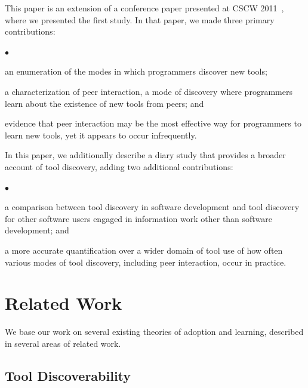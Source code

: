 \documentclass[smallextended]{svjour3}
\newcommand{\squishlist}{
	\vspace{0mm}
   \begin{list}{$\bullet$}
    { \setlength{\itemsep}{0pt}      \setlength{\parsep}{3pt}
      \setlength{\topsep}{3pt}       \setlength{\partopsep}{0pt}
      \setlength{\leftmargin}{1.5em} \setlength{\labelwidth}{1em}
      \setlength{\labelsep}{0.5em} } }
\newcommand{\squishend}{
    \end{list}  }
\newcommand\discovery{peer interaction\xspace}
\newcommand\context{mode\xspace}
\newcommand\contexts{modes\xspace}
\begin{document}
This paper is an extension of a conference paper presented at CSCW 2011~\citep{murphy-hill11:peer},
where we presented the first study.
In that paper, we made three primary contributions:

\squishlist
  \item an enumeration of the \contexts in which programmers discover new tools;
  \item a characterization of \discovery, a \context of discovery where
  		programmers learn about the existence of new tools from peers; and
  \item evidence that \discovery may be the most effective way for
  		programmers to learn new tools, yet it appears to occur infrequently.
\squishend

\noindent
In this paper, we additionally describe a diary study that provides a broader account
of tool discovery, adding two additional contributions:

\squishlist
  \item a comparison between tool discovery in software development and tool
  		discovery for other software users engaged in information work other than software development; and
  \item a more accurate quantification over a wider domain of tool use 
  		of how often various \contexts of tool discovery,
  		including \discovery, occur in practice.
\squishend



\section{Related Work}\label{sec:relatedWork}

\noindent
We base our work on several existing theories of adoption and
learning, described in several areas of related work.

\subsection{Tool Discoverability}\label{sec:terminology}
\end{document}
